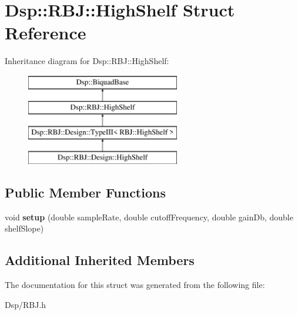\hypertarget{structDsp_1_1RBJ_1_1HighShelf}{\section{Dsp\-:\-:R\-B\-J\-:\-:High\-Shelf Struct Reference}
\label{structDsp_1_1RBJ_1_1HighShelf}
}
Inheritance diagram for Dsp\-:\-:R\-B\-J\-:\-:High\-Shelf\-:\begin{figure}[H]
\begin{center}
\leavevmode
\includegraphics[height=4.000000cm]{structDsp_1_1RBJ_1_1HighShelf}
\end{center}
\end{figure}
\subsection*{Public Member Functions}
\begin{DoxyCompactItemize}
\item 
\hypertarget{structDsp_1_1RBJ_1_1HighShelf_a7296719fa55f3ad669a4c5d63e5713f7}{void {\bfseries setup} (double sample\-Rate, double cutoff\-Frequency, double gain\-Db, double shelf\-Slope)}\label{structDsp_1_1RBJ_1_1HighShelf_a7296719fa55f3ad669a4c5d63e5713f7}

\end{DoxyCompactItemize}
\subsection*{Additional Inherited Members}


The documentation for this struct was generated from the following file\-:\begin{DoxyCompactItemize}
\item 
Dsp/R\-B\-J.\-h\end{DoxyCompactItemize}
